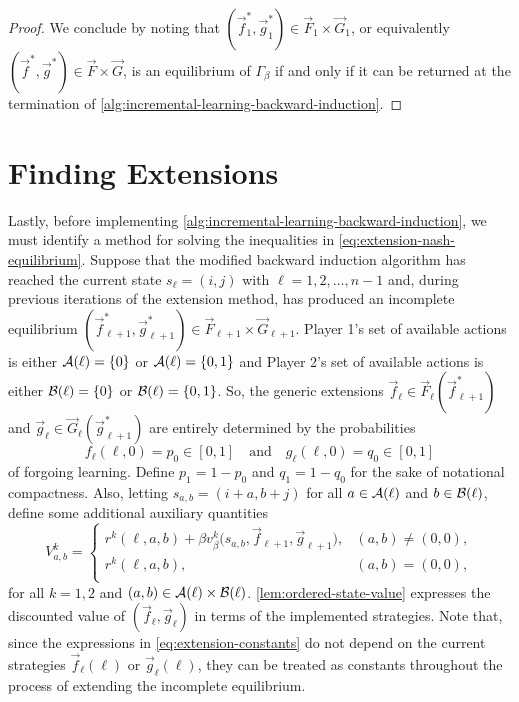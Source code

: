 \begin{proof}
        We conclude by noting that $(\vec{f}^*_1, \vec{g}^*_1) \in \vec{F}_1 \times \vec{G}_1$, or equivalently $(\vec{f}^*, \vec{g}^*) \in \vec{F} \times \vec{G}$, is an equilibrium of $\Gamma_\beta$ if and only if it can be returned at the termination of \autoref{alg:incremental-learning-backward-induction}.
    \end{proof}


\section{Finding Extensions} \label{sec:finding-extensions}
    Lastly, before implementing \autoref{alg:incremental-learning-backward-induction}, we must identify a method for solving the inequalities in \eqref{eq:extension-nash-equilibrium}.
    Suppose that the modified backward induction algorithm has reached the current state $s_\ell = (i, j)$ with $\ell = 1, 2, \ldots, n - 1$ and, during previous iterations of the extension method, has produced an incomplete equilibrium $(\vec{f}^*_{\ell + 1}, \vec{g}^*_{\ell + 1}) \in \vec{F}_{\ell + 1} \times \vec{G}_{\ell + 1}$.
    Player 1's set of available actions is either $\mathcal{A}(\ell) = \{0\}$ or $\mathcal{A}(\ell) = \{0, 1\}$ and Player 2's set of available actions is either $\mathcal{B}(\ell) = \{0\}$ or $\mathcal{B}(\ell) = \{0, 1\}$.
    So, the generic extensions $\vec{f}_\ell \in \vec{F}_{\ell}(\vec{f}^*_{\ell + 1})$ and $\vec{g}_\ell \in \vec{G}_{\ell}(\vec{g}^*_{\ell + 1})$ are entirely determined by the probabilities
    \[
        f_\ell(\ell, 0) 
            = p_0
            \in [0, 1]
        \quad\text{and}\quad
        g_\ell(\ell, 0) 
            = q_0
            \in [0, 1]
    \]
    of forgoing learning.
    Define $p_1 = 1 - p_0$ and $q_1 = 1 - q_0$ for the sake of notational compactness.
    Also, letting $s_{a, b} = (i + a, b + j)$ for all $a \in \mathcal{A}(\ell)$ and $b \in \mathcal{B}(\ell)$, define some additional auxiliary quantities
    \begin{equation}  \label{eq:extension-constants}
        V^k_{a, b}
            =
            \begin{cases}
                r^k(\ell, a, b) + \beta v^k_\beta\big(s_{a, b}, \vec{f}_{\ell + 1}, \vec{g}_{\ell + 1}\big), & (a, b) \neq (0, 0), \\
                r^k(\ell, a, b), & (a, b) = (0, 0), \\
            \end{cases}
    \end{equation}
    for all $k = 1, 2$ and $(a, b) \in \mathcal{A}(\ell) \times \mathcal{B}(\ell)$.
    \autoref{lem:ordered-state-value} expresses the discounted value of $(\vec{f}_\ell, \vec{g}_\ell)$ in terms of the implemented strategies.
    Note that, since the expressions in \eqref{eq:extension-constants} do not depend on the current strategies $\vec{f}_\ell(\ell)$ or $\vec{g}_\ell(\ell)$, they can be treated as constants throughout the process of extending the incomplete equilibrium.

